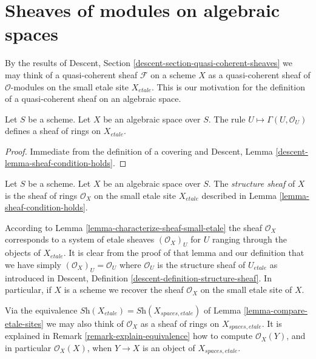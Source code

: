 \section{Sheaves of modules on algebraic spaces}
\label{section-modules}

\noindent
By the results of
Descent, Section \ref{descent-section-quasi-coherent-sheaves}
we may think of a quasi-coherent sheaf $\mathcal{F}$ on a scheme
$X$ as a quasi-coherent sheaf of $\mathcal{O}$-modules on the small
etale site $X_{etale}$. This is our motivation for the definition of
a quasi-coherent sheaf on an algebraic space.

\begin{lemma}
\label{lemma-sheaf-condition-holds}
Let $S$ be a scheme. Let $X$ be an algebraic space over $S$.
The rule $U \mapsto \Gamma(U, \mathcal{O}_U)$ defines
a sheaf of rings on $X_{etale}$.
\end{lemma}

\begin{proof}
Immediate from the definition of a covering and
Descent, Lemma \ref{descent-lemma-sheaf-condition-holds}.
\end{proof}

\begin{definition}
\label{definition-structure-sheaf}
Let $S$ be a scheme.
Let $X$ be an algebraic space over $S$.
The {\it structure sheaf} of $X$
is the sheaf of rings $\mathcal{O}_X$
on the small etale site $X_{etale}$ described in
Lemma \ref{lemma-sheaf-condition-holds}.
\end{definition}

\noindent
According to Lemma \ref{lemma-characterize-sheaf-small-etale} the sheaf
$\mathcal{O}_X$ corresponds to a system of etale sheaves $(\mathcal{O}_X)_U$
for $U$ ranging through the objects of $X_{etale}$. It is clear from the proof
of that lemma and our definition that we have simply
$(\mathcal{O}_X)_U = \mathcal{O}_U$ where $\mathcal{O}_U$ is the structure
sheaf of $U_{etale}$ as introduced in
Descent, Definition \ref{descent-definition-structure-sheaf}.
In particular, if $X$ is a scheme we recover the sheaf $\mathcal{O}_X$
on the small etale site of $X$.

\medskip\noindent
Via the equivalence $\textit{Sh}(X_{etale}) = \textit{Sh}(X_{spaces, etale})$
of Lemma \ref{lemma-compare-etale-sites} we may also think of
$\mathcal{O}_X$ as a sheaf of rings on $X_{spaces, etale}$. It is explained
in Remark \ref{remark-explain-equivalence} how to compute $\mathcal{O}_X(Y)$,
and in particular $\mathcal{O}_X(X)$, when $Y \to X$ is an object of
$X_{spaces, etale}$.

